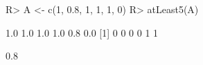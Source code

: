 \begin{Schunk}
% --begin: "quant2"
\begin{Sinput}
R> A <- c(1, 0.8, 1, 1, 1, 0)
R> atLeast5(A)
\end{Sinput}
\begin{Soutput}
[1] 1.0 1.0 1.0 1.0 0.8 0.0
[1] 0 0 0 0 1 1
\end{Soutput}
\begin{Soutput}
[1] 0.8
\end{Soutput}
%
% --end: "quant2"
\end{Schunk}
